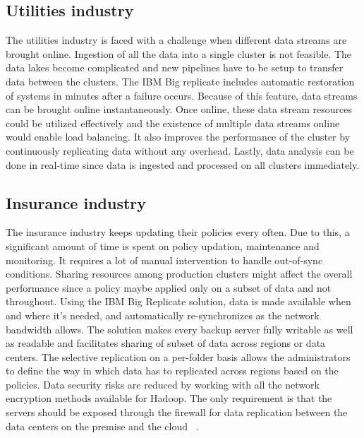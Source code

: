 \subsection{Utilities industry}
The utilities industry is faced with a challenge when different data streams are
brought online. Ingestion of all the data into a single cluster is not feasible.
The data lakes become complicated and new pipelines have to be setup to transfer
data between the clusters. The IBM Big replicate includes automatic restoration
of systems in minutes after a failure occurs. Because of this feature, data 
streams can be brought online instantaneously. Once online, these data stream
resources could be utilized effectively and the existence of multiple data 
streams online would enable load balancing. It also improves the performance
of the cluster by continuously replicating data without any overhead. Lastly,
data analysis can be done in real-time since data is ingested and processed on 
all clusters immediately.

\subsection{Insurance industry}
The insurance industry keeps updating their policies every often. Due to this, a
significant amount of time is spent on policy updation, maintenance and
monitoring. It requires a lot of manual intervention to handle out-of-sync 
conditions. Sharing resources among production clusters might affect the overall
performance since a policy maybe applied only on a subset of data and not 
throughout. Using the IBM Big Replicate solution, data is made available when 
and where it’s needed, and automatically re-synchronizes as the network
bandwidth allows. The solution makes every backup server fully writable as well
as readable and facilitates sharing of subset of data across regions or data 
centers. The selective replication on a per-folder basis allows the 
administrators to define the way in which data has to replicated across regions
based on the policies. Data security risks are reduced by working with all the 
network encryption methods available for Hadoop. The only requirement is that
the servers should be exposed through the firewall for data replication between
the data centers on the premise and the cloud
~\cite{hid-sp18-408-IBMBigReplicate-intro}.

